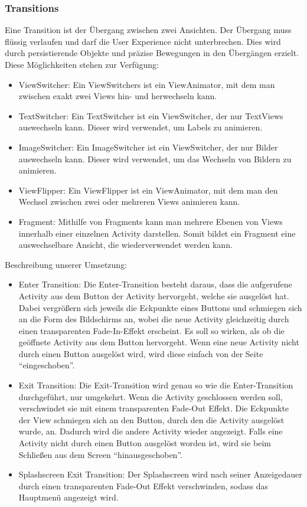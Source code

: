 \documentclass[FIPLY_base.tex]{subfiles}
\begin{document}
\subsubsection{Transitions}
Eine Transition ist der Übergang zwischen zwei Ansichten.
Der Übergang muss flüssig verlaufen und darf die User Experience nicht unterbrechen. Dies wird durch persistierende Objekte und präzise Bewegungen in den Übergängen erzielt.
Diese Möglichkeiten stehen zur Verfügung:
\begin{itemize}
	\item ViewSwitcher: Ein ViewSwitchers ist ein ViewAnimator, mit dem man zwischen exakt zwei Views hin- und herwechseln kann. 
	\item TextSwitcher: Ein TextSwitcher ist ein ViewSwitcher, der nur TextViews auswechseln kann. Dieser wird verwendet, um Labels zu animieren.
	\item ImageSwitcher: Ein ImageSwitcher ist ein ViewSwitcher, der nur Bilder auswechseln kann. Dieser wird verwendet, um das Wechseln von Bildern zu animieren.
	\item ViewFlipper: Ein ViewFlipper ist ein ViewAnimator, mit dem man den Wechsel zwischen zwei oder mehreren Views animieren kann.
	\item Fragment: Mithilfe von Fragments kann man mehrere Ebenen von Views innerhalb einer einzelnen Activity darstellen. Somit bildet ein 
	Fragment eine auswechselbare Ansicht, die wiederverwendet werden kann.
\end{itemize}
Beschreibung unserer Umsetzung:
\begin{itemize}
	\item Enter Transition: Die Enter-Transition besteht daraus, dass die aufgerufene Activity aus dem Button der Activity hervorgeht, welche sie ausgelöst hat. Dabei vergrößern sich jeweils die Eckpunkte eines Buttons und schmiegen sich an die Form des Bildschirms an, wobei die neue Activity gleichzeitig durch einen transparenten Fade-In-Effekt erscheint. Es soll so wirken, als ob die geöffnete Activity aus dem Button hervorgeht. Wenn eine neue Activity nicht durch einen Button ausgelöst wird, wird diese einfach von der Seite “eingeschoben”.
	\item Exit Transition: Die Exit-Transition wird genau so wie die Enter-Transition    durchgeführt, nur umgekehrt. Wenn die Activity geschlossen werden soll, verschwindet sie mit einem transparenten Fade-Out Effekt. Die Eckpunkte der View schmiegen sich an den Button, durch den die Activity ausgelöst wurde, an. Dadurch wird die andere Activity wieder angezeigt. Falls eine Activity nicht durch einen Button ausgelöst worden ist, wird sie beim Schließen aus dem Screen “hinausgeschoben”.
	\item Splashscreen Exit Transition: Der Splashscreen wird nach seiner Anzeigedauer durch einen transparenten Fade-Out Effekt verschwinden, sodass das Hauptmenü angezeigt wird.
\end{itemize}
\end{document}

